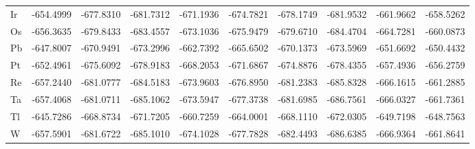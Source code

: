 \begin{table}[htbp]
{\begin{tabular}{l *{9}{c}}
      Ir & -654.4999 & -677.8310 & -681.7312 & -671.1936 & -674.7821 & -678.1749 & -681.9532 & -661.9662 & -658.5262 \\
      Os & -656.3635 & -679.8433 & -683.4557 & -673.1036 & -675.9479 & -679.6710 & -684.4704 & -664.7281 & -660.0873 \\
      Pb & -647.8007 & -670.9491 & -673.2996 & -662.7392 & -665.6502 & -670.1373 & -673.5969 & -651.6692 & -650.4432 \\
      Pt & -652.4961 & -675.6092 & -678.9183 & -668.2053 & -671.6867 & -674.8876 & -678.4355 & -657.4936 & -656.2759 \\
      Re & -657.2440 & -681.0777 & -684.5183 & -673.9603 & -676.8950 & -681.2383 & -685.8328 & -666.1615 & -661.2885 \\
      Ta & -657.4068 & -681.0711 & -685.1062 & -673.5947 & -677.3738 & -681.6985 & -686.7561 & -666.0327 & -661.7361 \\
      Tl & -645.7286 & -668.8734 & -671.7205 & -660.7259 & -664.0001 & -668.1110 & -672.0305 & -649.7198 & -648.7563 \\
      W  & -657.5901 & -681.6722 & -685.1010 & -674.1028 & -677.7828 & -682.4493 & -686.6385 & -666.9364 & -661.8641 \\
      \bottomrule
    \end{tabular}
  }
\end{table}

